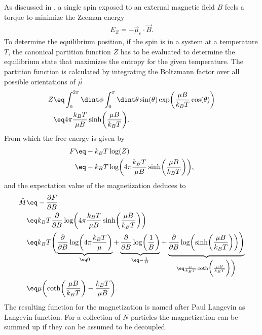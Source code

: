 \documentclass[\main/dresen_thesis.tex]{subfiles}
\begin{document}
    As discussed in , a single spin exposed to an external magnetic field $B$ feels a torque to minimize the Zeeman energy
    \begin{align}
      E_Z = - \vec{\mu}_e \cdot \vec{B}.
    \end{align}
    To determine the equilibrium position, if the spin is in a system at a temperature $T$, the canonical partition function $Z$ has to be evaluated to determine the equilibrium state that maximizes the entropy for the given temperature.
    The partition function is calculated by integrating the Boltzmann factor over all possible orientations of $\vec{\mu}$
    \begin{align}
      \begin{split}
        Z \eq& \int_0^{2\pi} \dint \phi \int_0^\pi \dint \theta \sin(\theta) \exp \biggl(\frac{\mu B}{k_B T} \cos(\theta) \biggr)\\
        \eq& 4 \pi \frac{k_B T}{ \mu B} \sinh \biggl( \frac{\mu B}{k_B T} \biggr).
      \end{split}
    \end{align}
    From which the free energy is given by
    \begin{align}
      \begin{split}
        F \eq& -k_B T \log(Z)\\
        \eq& -k_B T \log \biggl( 4 \pi \frac{k_B T}{ \mu B}  \sinh \biggl( \frac{\mu B}{k_B T} \biggr) \biggr),
      \end{split}
    \end{align}
    and the expectation value of the magnetization deduces to
    \begin{align}
      \begin{split}
        \tilde{M} \eq& - \frac{\partial F}{\partial B}\\
        \eq& k_B T \frac{\partial}{\partial B} \log \biggl( 4 \pi \frac{k_B T}{ \mu B}  \sinh \biggl( \frac{\mu B}{k_B T} \biggr) \biggr)\\
        \eq& k_B T \Biggl(
          \underbrace{\frac{\partial}{\partial B} \log \biggl( 4 \pi \frac{k_B T}{ \mu } \biggr)}_{\eq 0}
        + \underbrace{\frac{\partial}{\partial B} \log \biggl( \frac{1}{B} \biggr)}_{\eq - \frac{1}{B}}
        + \underbrace{\frac{\partial}{\partial B}\log  \biggl(  \sinh \biggl( \frac{\mu B}{k_B T} \biggr) \biggr) \Biggr)}_{\eq \frac{\mu }{k_B T} \coth \biggl( \frac{\mu B}{k_B T} \biggr) \biggr)}\\
        \eq& \mu \biggl(\coth \biggl( \frac{\mu B}{k_B T} \biggr) - \frac{k_B T}{\mu B} \biggr).
      \end{split}
    \end{align}
    The resulting function for the magnetization is named after Paul Langevin as Langevin function.
    For a collection of $N$ particles the magnetization can be summed up if they can be assumed to be decoupled.
\end{document}
